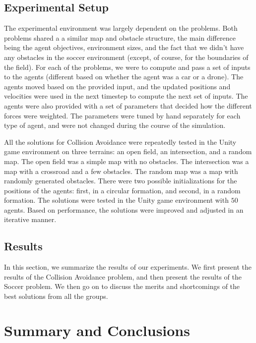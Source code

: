 \documentclass[a4paper,12pt]{article}
\begin{document}
\subsection{Experimental Setup}
\label{subsec:experimental_setup}
The experimental environment was largely dependent on the problems. Both problems shared a a similar map and obstacle structure, the main difference being the agent objectives, environment sizes, and the fact that we didn't have any obstacles in the soccer environment (except, of course, for the boundaries of the field). For each of the problems, we were to compute and pass a set of inputs to the agents (different based on whether the agent was a car or a drone). The agents moved based on the provided input, and the updated positions and velocities were used in the next timestep to compute the next set of inputs. The agents were also provided with a set of parameters that decided how the different forces were weighted. The parameters were tuned by hand separately for each type of agent, and were not changed during the course of the simulation.

All the solutions for Collision Avoidance were repeatedly tested in the Unity game environment on three terrains: an open field, an intersection, and a random map. The open field was a simple map with no obstacles. The intersection was a map with a crossroad and a few obstacles. The random map was a map with randomly generated obstacles. There were two possible initializations for the positions of the agents: first, in a circular formation, and second, in a random formation. The solutions were tested in the Unity game environment with $50$ agents. Based on performance, the solutions were improved and adjusted in an iterative manner.


\subsection{Results}
\label{subsec:results}
In this section, we summarize the results of our experiments. We first present the results of the Collision Avoidance problem, and then present the results of the Soccer problem. We then go on to discuss the merits and shortcomings of the best solutions from all the groups.









\section{Summary and Conclusions}
\end{document}
